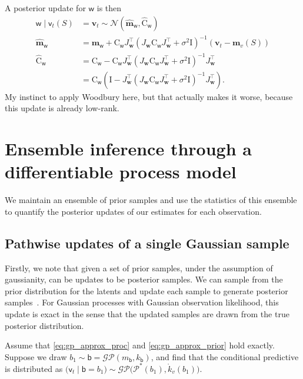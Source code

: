 \documentclass{article}
\newcommand{\vv}[1]{\boldsymbol{#1}}
\newcommand{\mm}[1]{\mathrm{#1}}
\newcommand{\rv}[1]{\mathsf{#1}}
\newcommand{\vrv}[1]{\vv{\rv{#1}}}
\newcommand{\dist}[1]{\mathcal{#1}}
\newcommand{\set}[1]{#1}
\newcommand{\op}[1]{\mathscr{#1}}
\newcommand{\gvn}{\mid}
\newcommand{\lat}{\rv{b}}   %
\newcommand{\latst}{b}      %
\newcommand{\latwt}{\vrv{w}}
\newcommand{\latwtst}{\vv{w}}
\begin{document}
A posterior update for \(\vrv{w}\) is then
\begin{align*}
    \latwt\gvn\rv{v}_{t}(\set{S})&=\vv{v}_{t}\sim\dist{N}(\hat{\vv{m}}_{\latwt},\hat{\mm{C}}_{\latwt} )\\
    \hat{\vv{m}}_{\latwt}
        &=\vv{m}_{\latwt}+\mm{C}_{\latwt}J_{\latwtst}^\top (J_{\latwtst}\mm{C}_{\latwt}J_{\latwtst}^{\top} + \sigma^2\mm{I})^{-1}\left(\vv{v}_{t}-\vv{m}_{v}(\set{S})\right) \\
    \hat{\mm{C}}_{\latwt}
        &=\mm{C}_{\latwt}-\mm{C}_{\latwt}J_{\latwtst}^\top (J_{\latwtst}\mm{C}_{\latwt}J_{\latwtst}^{\top} + \sigma^2\mm{I})^{-1} J_{\latwtst}^\top\\
        &=\mm{C}_{\latwt}(\mm{I}-J_{\latwtst}^\top (J_{\latwtst}\mm{C}_{\latwt}J_{\latwtst}^{\top} + \sigma^2\mm{I})^{-1} J_{\latwtst}^\top).
\end{align*}
My instinct to apply Woodbury here, but that actually makes it worse, because this update is already low-rank.
\todo{Optimal \(\set{S}\)?}

\section{Ensemble inference through a differentiable process model}

We maintain an ensemble of prior samples and use the statistics of this ensemble to quantify the posterior updates of our estimates for each observation.

\subsection{Pathwise updates of a single Gaussian sample}
Firstly, we note that given a set of prior samples, under the assumption of gaussianity, can be updates to be posterior samples.
We can sample from the prior distribution for the latents and update each sample to generate posterior samples~\cite{WilsonEfficiently2020,WilsonPathwise2021}.
For Gaussian processes with Gaussian observation likelihood, this update is exact in the sense that the updated samples are drawn from the true posterior distribution.

Assume that \eqref{eq:gp_approx_proc} and \eqref{eq:gp_approx_prior} hold exactly.
Suppose we draw \(\latst_{1}\sim \lat = \dist{GP}(m_{\lat},k_{\lat})\), and find that the conditional predictive is distributed as
\(\big(\rv{v}_{t}\gvn \lat{=}\latst_{1}\big)
\sim \dist{GP}\big(\op{P}^*(\latst_{1}),\mathring{k}_{v}(\latst_{1})\big)\).
\end{document}
